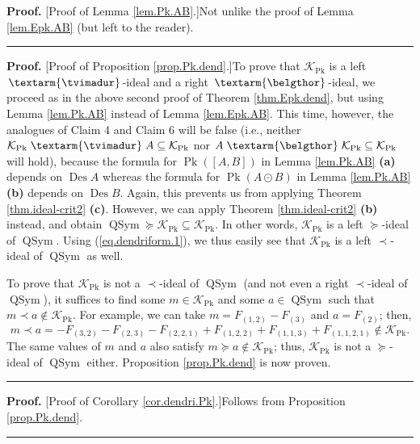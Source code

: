\documentclass[numbers=enddot,12pt,final,onecolumn,notitlepage]{scrartcl}%
\theoremstyle{definition}
\newenvironment{proof}[1][Proof]{\noindent\textbf{#1.} }{\ \rule{0.5em}{0.5em}}
\newenvironment{verlong}{}{}
\newcommand{\tvi}{\left. \textarm{\tvimadur} \right.}
\newcommand{\bel}{\left. \textarm{\belgthor} \right.}
\begin{document}
\begin{verlong}
\begin{proof}
[Proof of Lemma \ref{lem.Pk.AB}.]Not unlike the proof of Lemma
\ref{lem.Epk.AB} (but left to the reader).
\end{proof}

\begin{proof}
[Proof of Proposition \ref{prop.Pk.dend}.]To prove that $\mathcal{K}%
_{\operatorname*{Pk}}$ is a left $\tvi$-ideal and a right $\bel$-ideal, we
proceed as in the above second proof of Theorem \ref{thm.Epk.dend}, but using
Lemma \ref{lem.Pk.AB} instead of Lemma \ref{lem.Epk.AB}. This time, however,
the analogues of Claim 4 and Claim 6 will be false (i.e., neither
$\mathcal{K}_{\operatorname*{Pk}}\tvi A\subseteq\mathcal{K}%
_{\operatorname*{Pk}}$ nor $A\bel\mathcal{K}_{\operatorname*{Pk}}%
\subseteq\mathcal{K}_{\operatorname*{Pk}}$ will hold), because the formula for
$\operatorname*{Pk}\left(  \left[  A,B\right]  \right)  $ in Lemma
\ref{lem.Pk.AB} \textbf{(a)} depends on $\operatorname{Des}A$ whereas the
formula for $\operatorname*{Pk}\left(  A\odot B\right)  $ in Lemma
\ref{lem.Pk.AB} \textbf{(b)} depends on $\operatorname{Des}B$. Again, this
prevents us from applying Theorem \ref{thm.ideal-crit2} \textbf{(c)}. However,
we can apply Theorem \ref{thm.ideal-crit2} \textbf{(b)} instead, and obtain
$\operatorname*{QSym}\left.  \succeq\right.  \mathcal{K}_{\operatorname*{Pk}%
}\subseteq\mathcal{K}_{\operatorname*{Pk}}$. In other words, $\mathcal{K}%
_{\operatorname*{Pk}}$ is a left $\left.  \succeq\right.  $-ideal of
$\operatorname*{QSym}$. Using (\ref{eq.dendriform.1}), we thus easily see that
$\mathcal{K}_{\operatorname*{Pk}}$ is a left $\left.  \prec\right.  $-ideal of
$\operatorname*{QSym}$ as well.

To prove that $\mathcal{K}_{\operatorname*{Pk}}$ is not a $\left.
\prec\right.  $-ideal of $\operatorname*{QSym}$ (and not even a right $\left.
\prec\right.  $-ideal of $\operatorname*{QSym}$), it suffices to find some
$m\in\mathcal{K}_{\operatorname*{Pk}}$ and some $a\in\operatorname*{QSym}$
such that $m\left.  \prec\right.  a\notin\mathcal{K}_{\operatorname*{Pk}}$.
For example, we can take $m=F_{\left(  1,2\right)  }-F_{\left(  3\right)  }$
and $a=F_{\left(  2\right)  }$; then,
\[
m\left.  \prec\right.  a=-F_{\left(  3,2\right)  }-F_{\left(  2,3\right)
}-F_{\left(  2,2,1\right)  }+F_{\left(  1,2,2\right)  }+F_{\left(
1,1,3\right)  }+F_{\left(  1,1,2,1\right)  }\notin\mathcal{K}%
_{\operatorname*{Pk}}.
\]
The same values of $m$ and $a$ also satisfy $m\left.  \succeq\right.
a\notin\mathcal{K}_{\operatorname*{Pk}}$; thus, $\mathcal{K}%
_{\operatorname*{Pk}}$ is not a $\left.  \succeq\right.  $-ideal of
$\operatorname*{QSym}$ either. Proposition \ref{prop.Pk.dend} is now proven.
\end{proof}

\begin{proof}
[Proof of Corollary \ref{cor.dendri.Pk}.]Follows from Proposition
\ref{prop.Pk.dend}.
\end{proof}
\end{verlong}
\end{document}
